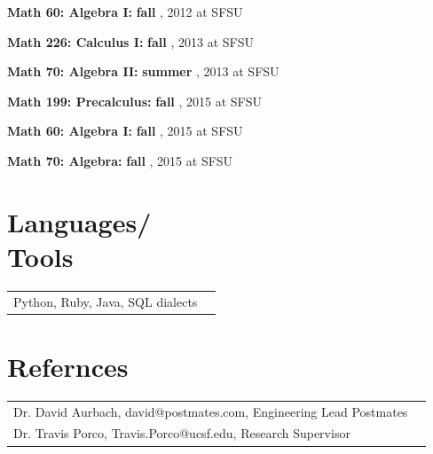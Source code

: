 \documentclass[margin,line,pifont,palatino,courier]{res}
\newenvironment{list1}{
  \begin{list}{\label{ } }{
      \setlength{\itemsep}{0in}
      \setlength{\parsep}{0in} \setlength{\parskip}{0in}
      \setlength{\topsep}{0in} \setlength{\partopsep}{0in}
      \setlength{\leftmargin}{0.0in} } }{\end{list} }
\begin{document}
\begin{resume}
\begin{list1}
    
        \item  {\bf Math 60: Algebra I:}\textbf{ fall  },  2012 at SFSU
    
        \item  {\bf Math 226: Calculus I:}\textbf{ fall  },  2013 at SFSU
    
        \item  {\bf Math 70: Algebra II:}\textbf{ summer  },  2013 at SFSU
    
        \item  {\bf Math 199: Precalculus:}\textbf{ fall  },  2015 at SFSU
    
        \item  {\bf Math 60: Algebra I:}\textbf{ fall  },  2015 at SFSU
    
        \item  {\bf Math 70: Algebra:}\textbf{ fall  },  2015 at SFSU
    

  \end{list1}


\section{\sc Languages/ \\ Tools}
  \begin{tabular}{@{}p{6in}p{3in}}
     Python,  Ruby,  Java,  SQL dialects 
  \end{tabular}

\section{\sc Refernces}
\begin{tabular}{@{}p{6in}p{3in}}
     Dr. David Aurbach, david@postmates.com, Engineering Lead Postmates \\  Dr. Travis Porco, Travis.Porco@ucsf.edu, Research Supervisor \\ 
  \end{tabular}
   

\end{resume}
\end{document}
